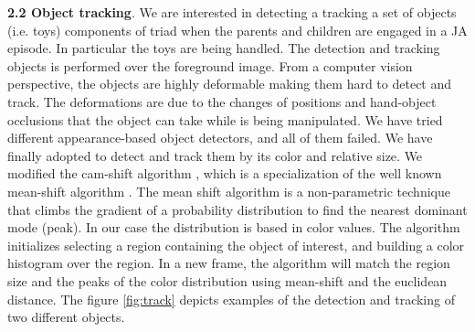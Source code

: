 \documentclass[10pt,letterpaper]{article}
\begin{document}
{\bf 2.2 Object tracking}. We are interested in detecting a tracking a set of objects (i.e. toys) components of triad when the parents and children are engaged in a JA episode. In particular the toys are being handled. The detection and tracking objects is performed over the foreground image. From a computer vision perspective, the objects are highly deformable making them hard to detect and track. The deformations are due to the changes of positions and hand-object occlusions that the object can take while is being manipulated. We have tried different appearance-based \cite{TLD} object detectors, and all of them failed. We have finally adopted to detect and track them by its color and relative size. We modified the cam-shift algorithm \cite{bradsky}, which is a specialization of  the well known mean-shift algorithm \cite{Meer2002}. The mean shift algorithm is a non-parametric technique that climbs the gradient of a probability distribution to find the nearest dominant mode (peak). In our case the distribution is based in color values. The algorithm initializes selecting a region containing the object of interest, and building a color histogram over the region. In a new frame, the algorithm will match the region size and the peaks of the color distribution using mean-shift and the euclidean distance. The figure \ref{fig:track} depicts examples of the detection and tracking of two different objects.\\
\end{document}
